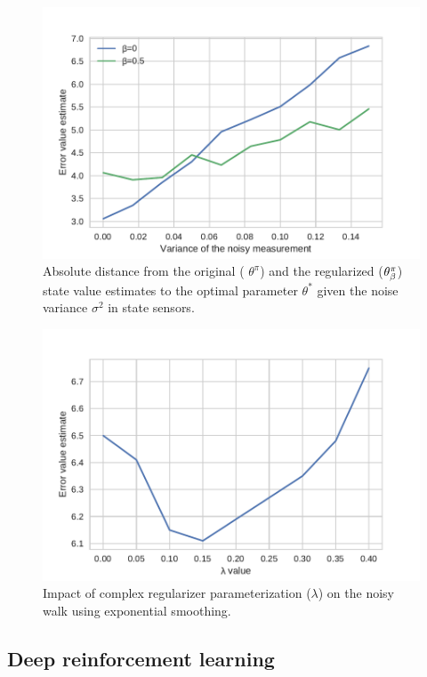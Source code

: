 \begin{figure}
\centering
\includegraphics[scale=0.6]{./fig/noisy_walk.pdf}
\caption[Noisy states]{Absolute distance from the original ( $\theta^\pi$) and the regularized ($\theta^\pi_\beta$) state value estimates to the optimal parameter $\theta^*$ given the noise variance $\sigma^2$ in state sensors.}
\label{fig:perf_MDP_noisy}
\end{figure}

\begin{figure}
\centering
\includegraphics[scale=0.6]{./fig/error_noisy.pdf}
\caption[Impact of complex regularizers]{Impact of complex regularizer parameterization ($\lambda$) on the noisy walk using exponential smoothing.}
\label{fig:smoothing}
\end{figure}

\subsection{Deep reinforcement learning}
\label{sec:expe:drl}

